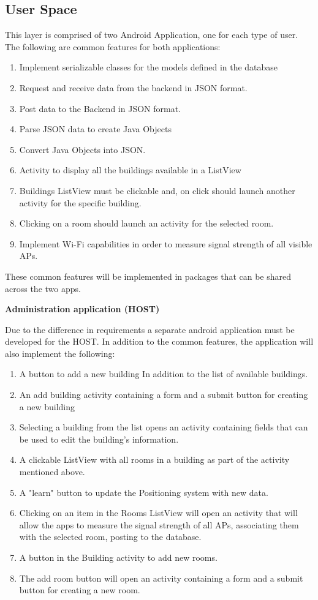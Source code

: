 \subsection{User Space}
\noindent This layer is comprised of two Android Application, one for each type of user. The following are common features for both applications:
\begin{enumerate}
\item Implement serializable classes for the models defined in the database
\item Request and receive data from the backend in JSON format.
\item Post data to the Backend in JSON format.
\item Parse JSON data to create Java Objects
\item Convert Java Objects into JSON.
\item Activity to display all the buildings available in a ListView
\item Buildings ListView must be clickable and, on click should launch another activity for the specific building.
\item Clicking on a room should launch an activity for the selected room.
\item Implement Wi-Fi capabilities in order to measure signal strength of all visible APs.
\end{enumerate}
These common features will be implemented in packages that can be shared across the two apps.

\noindent \textbf{Administration application (HOST)}

Due to the difference in requirements a separate android application must be developed for the HOST. In addition to the common features, the application will also implement the following:
\begin{enumerate}
\item A button to add a new building In addition to the list of available buildings.
\item An add building activity containing a form and a submit button for creating a new building
\item Selecting a building from the list opens an activity containing fields that can be used to edit the building’s information.
\item A clickable ListView with all rooms in a building as part of the activity mentioned above.
\item A "learn" button to update the Positioning system with new data.
\item Clicking on an item in the Rooms ListView will open an activity that will allow the apps to measure the signal strength of all APs, associating them with the selected room, posting to the database.
\item A button in the Building activity to add new rooms.
\item The add room button will open an activity containing a form and a submit button for creating a new room.
\end{enumerate}

